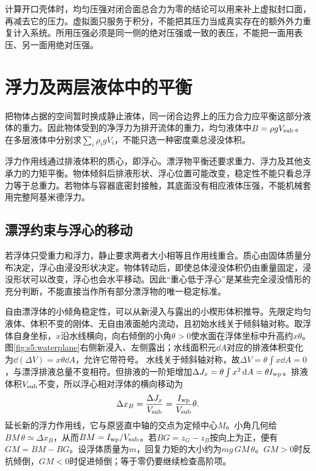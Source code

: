 计算开口壳体时，均匀压强对闭合面总合力为零的结论可以用来补上虚拟封口面，再减去它的压力。虚拟面只服务于积分，不能把其压力当成真实存在的额外外力重复计入系统。所用压强必须是同一侧的绝对压强或一致的表压，不能把一面用表压、另一面用绝对压强。


\section{浮力及两层液体中的平衡}
把物体占据的空间暂时换成静止液体，同一闭合边界上的压力合力应平衡这部分液体的重力。因此物体受到的净浮力为排开流体的重力，均匀液体中$B=\rho gV_{\rm sub}$。在多层液体中分别求$\sum_i\rho_i gV_i$，不能只选一种密度乘总浸没体积。

浮力作用线通过排液体积的质心，即浮心。漂浮物平衡还要求重力、浮力及其他支承力的力矩平衡。物体倾斜后排液形状、浮心位置可能改变，稳定性不能只看总浮力等于总重力。若物体与容器底密封接触，其底面没有相应液体压强，不能机械套用完整阿基米德浮力。

\subsection{漂浮约束与浮心的移动}
若浮体只受重力和浮力，静止要求两者大小相等且作用线重合。质心由固体质量分布决定，浮心由浸没形状决定。物体转动后，即使总体浸没体积仍由重量固定，浸没形状可以改变，浮心也会水平移动。因此“重心低于浮心”是某些完全浸没情形的充分判断，不能直接当作所有部分漂浮物的唯一稳定标准。

自由漂浮体的小倾角稳定性，可以从新浸入与露出的小楔形体积推导。先限定均匀液体、体积不变的刚体、无自由液面舱内流动，且初始水线关于倾斜轴对称。取浮体自身坐标，$x$沿水线横向，向右倾倒的小角$\theta>0$使水面在浮体坐标中升高约$x\theta$。图\ref{fig:s5:waterplane}右侧新浸入、左侧露出；水线面积元$\dd A$对应的排液体积变化为$\dd(\Delta V)=x\theta\dd A$，允许它带符号。
水线关于倾斜轴对称，故$\Delta V=\theta\int x\dd A=0$，与漂浮排液总量不变相符。但排液的一阶矩增加$\Delta J_x=\theta\int x^2\mathop{}\!\mathrm d A=\theta I_{\rm wp}$。排液体积$V_{\rm sub}$不变，所以浮心相对浮体的横向移动为
\[
\Delta x_B=\frac{\Delta J_x}{V_{\rm sub}}
=\frac{I_{\rm wp}}{V_{\rm sub}}\theta.
\]
延长新的浮力作用线，它与原竖直中轴的交点为定倾中心$M$。小角几何给$BM\,\theta\simeq\Delta x_B$，从而$BM=I_{\rm wp}/V_{\rm sub}$。若$BG=z_G-z_B$按向上为正，便有$GM=BM-BG$。设浮体质量为$m$，回复力矩的大小约为$mg\,GM\,\theta$。$GM>0$时反抗倾倒，$GM<0$时促进倾倒；等于零仍要继续检查高阶项。

